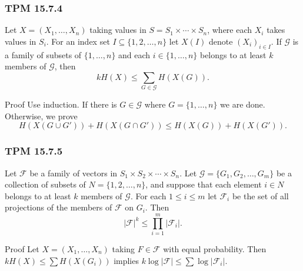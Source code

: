 \documentclass{beamer}
\begin{document}
\begin{frame}
  \frametitle{TPM 15.7.4}
  Let $X = (X_1, \dotsc, X_n)$ taking values in $S = S_1 \times \dotsb \times S_n$, where each $X_i$ takes values in $S_i$. For an index set $I \subseteq \{ 1, 2, \dotsc, n \}$ let $X(I)$ denote $(X_i)_{i \in I}$. If $\mathcal{G}$ is a family of subsets of $\{ 1, \dotsc, n \}$ and each $i \in \{ 1, \dotsc, n \}$ belongs to at least $k$ members of $\mathcal{G}$, then \[ kH(X) \le \sum_{G \in \mathcal{G}} H(X(G)). \]

  \begin{block}{Proof}
    Use induction. If there is $G \in \mathcal{G}$ where $G = \{ 1, \dotsc, n \}$ we are done. Otherwise, we prove \[ H(X(G \cup G')) + H(X(G \cap G')) \le H(X(G)) + H(X(G')). \]
  \end{block}
\end{frame}

\begin{frame}
  \frametitle{TPM 15.7.5}
  Let $\mathcal{F}$ be a family of vectors in $S_1 \times S_2 \times \dotsb \times S_n$. Let $\mathcal{G} = \{ G_1, G_2, \dotsc, G_m \}$ be a collection of subsets of $N = \{ 1, 2, \dotsc, n \}$, and suppose that each element $i \in N$ belongs to at least $k$ members of $\mathcal{G}$. For each $1 \le i \le m$ let $\mathcal{F}_i$ be the set of all projections of the members of $\mathcal{F}$ on $G_i$. Then \[ |\mathcal{F}|^k \le \prod_{i = 1}^m |\mathcal{F}_i|. \]

  \begin{block}{Proof}
    Let $X = (X_1, \dotsc, X_n)$ taking $F \in \mathcal{F}$ with equal probability. Then $kH(X) \le \sum H(X(G_i))$ implies $k \log |\mathcal{F}| \le \sum \log |\mathcal{F}_i|$.
  \end{block}
\end{frame}
\end{document}
